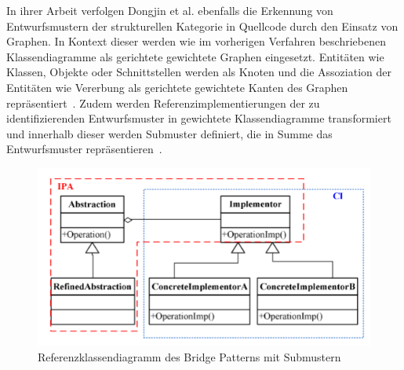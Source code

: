 \pagebreak

In ihrer Arbeit verfolgen Dongjin et al. ebenfalls die Erkennung von Entwurfsmustern der strukturellen Kategorie in Quellcode durch den Einsatz von Graphen. In Kontext dieser werden wie im vorherigen Verfahren beschriebenen Klassendiagramme als gerichtete gewichtete Graphen eingesetzt.
Entitäten wie Klassen, Objekte oder Schnittstellen werden als Knoten und die Assoziation der Entitäten wie Vererbung als gerichtete gewichtete Kanten des Graphen repräsentiert~\cite[S. 582]{6649882}.
Zudem werden Referenzimplementierungen der zu identifizierenden Entwurfsmuster in gewichtete Klassendiagramme transformiert und innerhalb dieser werden Submuster definiert, die in Summe das Entwurfsmuster repräsentieren~\cite[S. 580]{6649882}.

\begin{figure}[h]
    \centering
    \includegraphics[scale=0.75]{figures/struture_bridge.png}
    \caption{Referenzklassendiagramm des Bridge Patterns mit Submustern}
    \label{fig:structure_bridge}
\end{figure}

